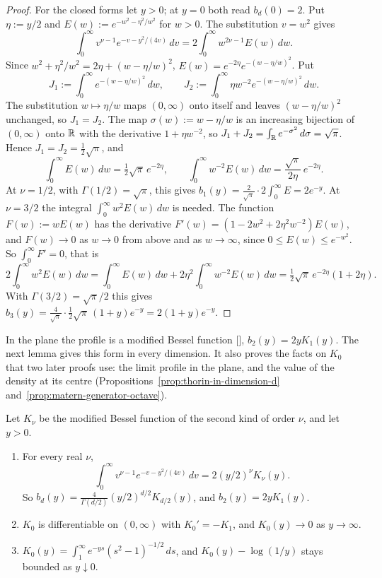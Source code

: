 \begin{proof}
For the closed forms let $y > 0$; at $y = 0$ both read $b_d(0) = 2$. Put $\eta := y/2$ and
$E(w) := e^{-w^2 - \eta^2/w^2}$ for $w > 0$. The substitution $v = w^2$ gives
\[
  \int_0^\infty v^{\nu-1}e^{-v-y^2/(4v)}\,dv = 2\int_0^\infty w^{2\nu-1}E(w)\,dw .
\]
Since $w^2 + \eta^2/w^2 = 2\eta + (w - \eta/w)^2$, $E(w) = e^{-2\eta}e^{-(w - \eta/w)^2}$. Put
\[
  J_1 := \int_0^\infty e^{-(w - \eta/w)^2}\,dw , \qquad
  J_2 := \int_0^\infty \eta w^{-2}e^{-(w - \eta/w)^2}\,dw .
\]
The substitution $w \mapsto \eta/w$ maps $(0, \infty)$ onto itself and leaves $(w - \eta/w)^2$
unchanged, so $J_1 = J_2$. The map $\sigma(w) := w - \eta/w$ is an increasing bijection of
$(0, \infty)$ onto $\mathbb{R}$ with the derivative $1 + \eta w^{-2}$, so
$J_1 + J_2 = \int_{\mathbb{R}}e^{-\sigma^2}\,d\sigma = \sqrt\pi$. Hence $J_1 = J_2 = \tfrac12\sqrt\pi$, and
\[
  \int_0^\infty E(w)\,dw = \tfrac12\sqrt\pi\,e^{-2\eta} , \qquad
  \int_0^\infty w^{-2}E(w)\,dw = \frac{\sqrt\pi}{2\eta}\,e^{-2\eta} .
\]
At $\nu = 1/2$, with $\Gamma(1/2) = \sqrt\pi$, this gives
$b_1(y) = \frac{2}{\sqrt\pi}\cdot2\int_0^\infty E = 2e^{-y}$. At $\nu = 3/2$ the integral
$\int_0^\infty w^2E(w)\,dw$ is needed. The function $F(w) := wE(w)$ has the derivative
$F'(w) = (1 - 2w^2 + 2\eta^2w^{-2})E(w)$, and $F(w) \to 0$ as $w \to 0$ from above and as
$w \to \infty$, since $0 \le E(w) \le e^{-w^2}$. So $\int_0^\infty F' = 0$, that is
\[
  2\int_0^\infty w^2E(w)\,dw = \int_0^\infty E(w)\,dw + 2\eta^2\int_0^\infty w^{-2}E(w)\,dw
   = \tfrac12\sqrt\pi\,e^{-2\eta}(1 + 2\eta) .
\]
With $\Gamma(3/2) = \sqrt\pi/2$ this gives
$b_3(y) = \frac{4}{\sqrt\pi}\cdot\tfrac12\sqrt\pi\,(1 + y)e^{-y} = 2(1 + y)e^{-y}$.
\end{proof}

In the plane the profile is a modified Bessel function [], $b_2(y) = 2yK_1(y)$. The
next lemma gives this form in every dimension. It also proves the facts on $K_0$ that two later
proofs use: the limit profile in the plane, and the value of the density at its centre
(Propositions~\ref{prop:thorin-in-dimension-d} and~\ref{prop:matern-generator-octave}).

\begin{lemma}
\label{lem:bessel-k}

Let $K_\nu$ be the modified Bessel function of the second kind of order $\nu$, and let $y > 0$.
\begin{enumerate}
\item For every real $\nu$,
\[
  \int_0^\infty v^{\nu-1}e^{-v-y^2/(4v)}\,dv = 2(y/2)^\nu K_\nu(y) .
\]
So $b_d(y) = \frac{4}{\Gamma(d/2)}(y/2)^{d/2}K_{d/2}(y)$, and $b_2(y) = 2yK_1(y)$.
\item $K_0$ is differentiable on $(0, \infty)$ with $K_0' = -K_1$, and $K_0(y) \to 0$ as
$y \to \infty$.
\item $K_0(y) = \int_1^\infty e^{-ys}(s^2 - 1)^{-1/2}\,ds$, and $K_0(y) - \log(1/y)$ stays bounded
as $y \downarrow 0$.
\end{enumerate}
\end{lemma}

